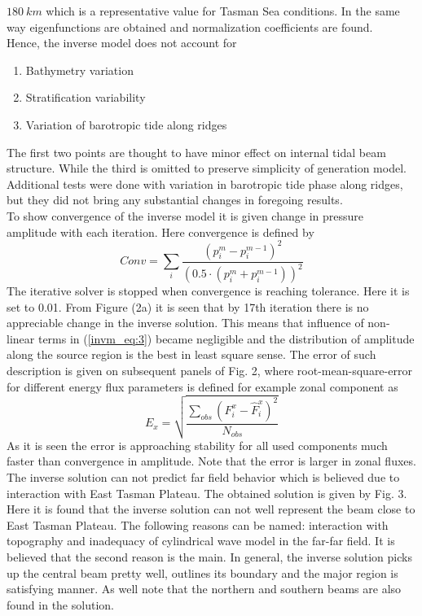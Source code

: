 \documentclass[12pt]{article}
\begin{document}
$180~km$ which is a representative value for Tasman Sea conditions. In the same way eigenfunctions 
are obtained and normalization coefficients are found.\\
Hence, the inverse model does not account for
\begin{enumerate}
\item Bathymetry variation
\item Stratification variability
\item Variation of barotropic tide along ridges
\end{enumerate}
The first two points are thought to have minor effect on internal tidal beam structure. While the third is omitted to preserve simplicity of generation model. Additional tests were done with variation in barotropic tide phase along ridges, but they did not bring any substantial changes in foregoing results.\\
To show convergence of the inverse model it is given change in pressure amplitude with each iteration. Here convergence is defined by
\begin{equation*}
Conv = \sum_i \frac{(p_i^m - p_i^{m-1})^2}{(0.5 \cdot (p_i^m + p_i^{m-1}))^2}
\end{equation*}
The iterative solver is stopped when convergence is reaching tolerance. Here it is set to 0.01. From Figure (2a) it is seen that by 17th iteration there is no appreciable change in the inverse solution. This means that influence of non-linear terms in (\ref{invm_eq:3}) became negligible and the distribution of amplitude along the source region is the best in least square sense. The error of such description is given on subsequent panels of Fig. 2, where root-mean-square-error for different energy flux parameters is defined for example zonal component as
\begin{equation}
E_{x} = \sqrt{\frac{\sum_{obs} (F_i^x - \hat{F}_i^x)^2}{N_{obs}}}
\end{equation}
As it is seen the error is approaching stability for all used components much faster than 
convergence in amplitude. Note that the error is larger in zonal fluxes. The inverse solution can 
not predict far field behavior which is believed due to interaction with East Tasman Plateau. The 
obtained solution is given by Fig. 3. Here it is found that the inverse solution can not well 
represent the beam close to East Tasman Plateau. The following reasons can be named: interaction 
with topography and inadequacy of cylindrical wave model in the far-far field. It is believed that 
the second reason is the main. In general, the inverse solution picks up the central beam pretty 
well, outlines its boundary and the major region is satisfying manner. As well note that the 
northern and southern beams are also found in the solution.
\end{document}

